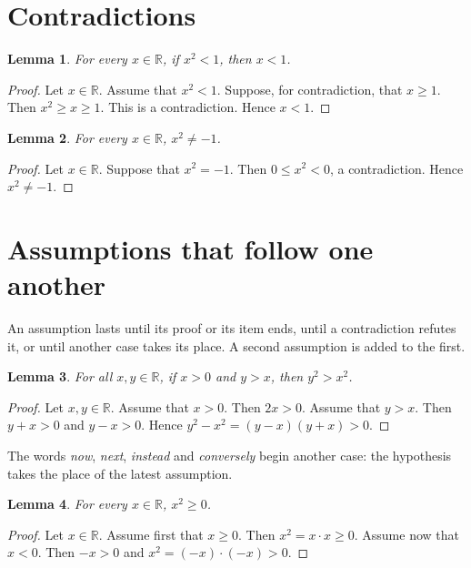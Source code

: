 \documentclass{article}
\newtheorem{lemma}{Lemma}
\begin{document}
\section{Contradictions}

\begin{lemma}\label{lem:contradiction}
For every $x\in\mathbb{R}$, if $x^2<1$, then $x<1$.
\end{lemma}

\begin{proof}
Let $x\in\mathbb{R}$.
Assume that $x^2<1$.
Suppose, for contradiction, that $x\ge1$.
Then $x^2\ge x\ge1$.
This is a contradiction.
Hence $x<1$.
\end{proof}

\begin{lemma}\label{lem:short}
For every $x\in\mathbb{R}$, $x^2\ne-1$.
\end{lemma}

\begin{proof}
Let $x\in\mathbb{R}$.
Suppose that $x^2=-1$.
Then $0\le x^2<0$, a contradiction.
Hence $x^2\ne-1$.
\end{proof}

\section{Assumptions that follow one another}

An assumption lasts until its proof or its item ends, until a contradiction refutes it, or until another case takes its place.
A second assumption is added to the first.

\begin{lemma}\label{lem:added}
For all $x,y\in\mathbb{R}$, if $x>0$ and $y>x$, then $y^2>x^2$.
\end{lemma}

\begin{proof}
Let $x,y\in\mathbb{R}$.
Assume that $x>0$.
Then $2x>0$.
Assume that $y>x$.
Then $y+x>0$ and $y-x>0$.
Hence $y^2-x^2=(y-x)(y+x)>0$.
\end{proof}

The words \emph{now}, \emph{next}, \emph{instead} and \emph{conversely} begin another case: the hypothesis takes the place of the latest assumption.

\begin{lemma}\label{lem:square}
For every $x\in\mathbb{R}$, $x^2\ge0$.
\end{lemma}

\begin{proof}
Let $x\in\mathbb{R}$.
Assume first that $x\ge0$.
Then $x^2=x\cdot x\ge0$.
Assume now that $x<0$.
Then $-x>0$ and $x^2=(-x)\cdot(-x)>0$.
\end{proof}
\end{document}
